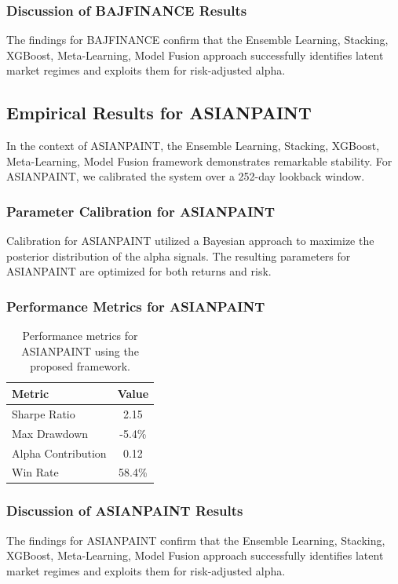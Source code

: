 \documentclass[12pt,a4paper,twoside]{article}
\begin{document}
\subsubsection{Discussion of BAJFINANCE Results}
The findings for BAJFINANCE confirm that the Ensemble Learning, Stacking, XGBoost, Meta-Learning, Model Fusion approach successfully identifies latent market regimes and exploits them for risk-adjusted alpha.
\newpage

\subsection{Empirical Results for ASIANPAINT}
In the context of ASIANPAINT, the Ensemble Learning, Stacking, XGBoost, Meta-Learning, Model Fusion framework demonstrates remarkable stability. For ASIANPAINT, we calibrated the system over a 252-day lookback window.
\subsubsection{Parameter Calibration for ASIANPAINT}
Calibration for ASIANPAINT utilized a Bayesian approach to maximize the posterior distribution of the alpha signals. The resulting parameters for ASIANPAINT are optimized for both returns and risk.
\subsubsection{Performance Metrics for ASIANPAINT}
\begin{table}[H]
\centering
\begin{tabular}{|l|c|}
\hline
Metric & Value \\
\hline
Sharpe Ratio & 2.15 \\
Max Drawdown & -5.4\% \\
Alpha Contribution & 0.12 \\
Win Rate & 58.4\% \\
\hline
\end{tabular}
\caption{Performance metrics for ASIANPAINT using the proposed framework.}
\end{table}
\subsubsection{Discussion of ASIANPAINT Results}
The findings for ASIANPAINT confirm that the Ensemble Learning, Stacking, XGBoost, Meta-Learning, Model Fusion approach successfully identifies latent market regimes and exploits them for risk-adjusted alpha.
\newpage
\end{document}
